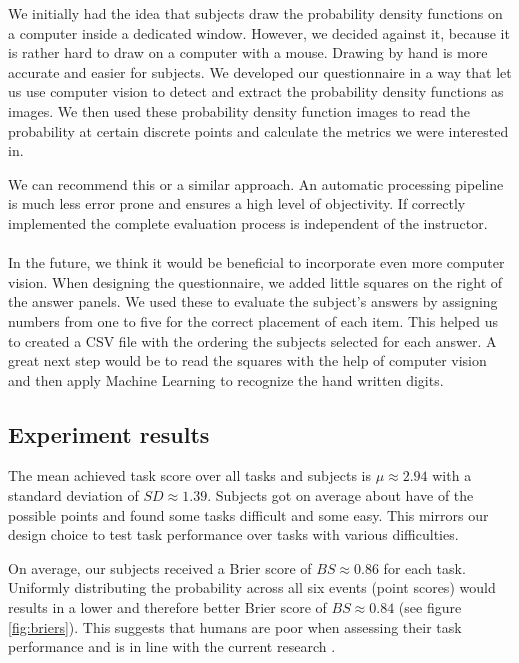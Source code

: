 \documentclass[../main/main.tex]{subfiles}
\begin{document}
	We initially had the idea that subjects draw the probability density functions on a computer inside a dedicated window. However, we decided against it, because it is rather hard to draw on a computer with a mouse. Drawing by hand is more accurate and easier for subjects. We developed our questionnaire in a way that let us use computer vision to detect and extract the probability density functions as images. We then used these probability density function images to read the probability at certain discrete points and calculate the metrics we were interested in.
	
	We can recommend this or a similar approach. An automatic processing pipeline is much less error prone and ensures a high level of objectivity. If correctly implemented the complete evaluation process is independent of the instructor. 
	\\\\
	In the future, we think it would be beneficial to incorporate even more computer vision. When designing the questionnaire, we added little squares on the right of the answer panels. We used these to evaluate the subject's answers by assigning numbers from one to five for the correct placement of each item. This helped us to created a CSV file with the ordering the subjects selected for each answer. A great next step would be to read the squares with the help of computer vision and then apply Machine Learning to recognize the hand written digits. 
	
	\subsection{Experiment results}
	\label{sec:exp_results}
	
	The mean achieved task score over all tasks and subjects is $\mu  \approx 2.94$ with a standard deviation of $SD \approx 1.39$. Subjects got on average about have of the possible points and found some tasks difficult and some easy. This mirrors our design choice to test task performance over tasks with various difficulties.
	
	On average, our subjects received a Brier score of $BS \approx 0.86$ for each task. Uniformly distributing the probability across all six events (point scores) would results in a lower and therefore better Brier score of $BS \approx 0.84$ (see figure \ref{fig:briers}). This suggests that humans are poor when assessing their task performance and is in line with the current research \cite{raaijmakers2019effects, sedikides1993assessment}. 
	
\end{document}

